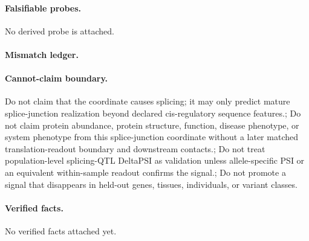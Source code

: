 \paragraph{Falsifiable probes.}
No derived probe is attached.

\paragraph{Mismatch ledger.}
\paragraph{Cannot-claim boundary.} Do not claim that the coordinate causes splicing; it may only predict mature splice-junction realization beyond declared cis-regulatory sequence features.; Do not claim protein abundance, protein structure, function, disease phenotype, or system phenotype from this splice-junction coordinate without a later matched translation-readout boundary and downstream contacts.; Do not treat population-level splicing-QTL DeltaPSI as validation unless allele-specific PSI or an equivalent within-sample readout confirms the signal.; Do not promote a signal that disappears in held-out genes, tissues, individuals, or variant classes.

\paragraph{Verified facts.}
No verified facts attached yet.
